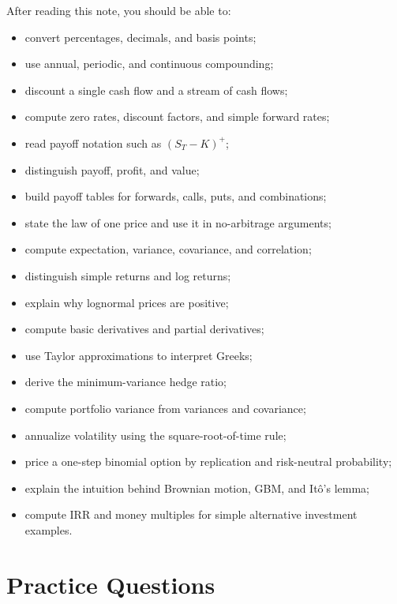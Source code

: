 After reading this note, you should be able to:
\begin{itemize}
    \item convert percentages, decimals, and basis points;
    \item use annual, periodic, and continuous compounding;
    \item discount a single cash flow and a stream of cash flows;
    \item compute zero rates, discount factors, and simple forward rates;
    \item read payoff notation such as $(S_T-K)^+$;
    \item distinguish payoff, profit, and value;
    \item build payoff tables for forwards, calls, puts, and combinations;
    \item state the law of one price and use it in no-arbitrage arguments;
    \item compute expectation, variance, covariance, and correlation;
    \item distinguish simple returns and log returns;
    \item explain why lognormal prices are positive;
    \item compute basic derivatives and partial derivatives;
    \item use Taylor approximations to interpret Greeks;
    \item derive the minimum-variance hedge ratio;
    \item compute portfolio variance from variances and covariance;
    \item annualize volatility using the square-root-of-time rule;
    \item price a one-step binomial option by replication and risk-neutral
    probability;
    \item explain the intuition behind Brownian motion, GBM, and It\^o's lemma;
    \item compute IRR and money multiples for simple alternative investment
    examples.
\end{itemize}

\section{Practice Questions}

